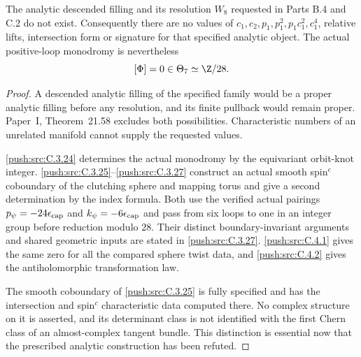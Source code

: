 \begin{corollary}\label{push:src:C.5.1}
The analytic descended filling and its resolution $W_8$
requested in Parts B.4 and C.2 do not exist. Consequently
there are no values of $c_1,c_2,p_1,p_1^2,p_1c_1^2,c_1^4$,
relative lifts, intersection form or signature for that
specified analytic object. The actual positive-loop
monodromy is nevertheless
\[
                    [\Phi]=0\in\Theta_7\simeq\Z/28.
\]
\end{corollary}

\begin{proof}
A descended analytic filling of the specified family
would be a proper analytic filling before any resolution,
and its finite pullback would remain proper. Paper~I, Theorem~21.58
excludes both possibilities. Characteristic numbers of
an unrelated manifold cannot supply the requested values.

\ref{push:src:C.3.24} determines the actual monodromy by the equivariant
orbit-knot integer. \ref{push:src:C.3.25}--\ref{push:src:C.3.27} construct an actual
smooth spin$^c$ coboundary of the clutching sphere and
mapping torus and give a second determination by the
index formula. Both use the verified actual pairings
$p_\psi=-24\epsilon_{\rm cap}$ and
$k_\psi=-6\epsilon_{\rm cap}$ and pass from six loops
to one in an integer group before reduction modulo $28$.
Their distinct boundary-invariant arguments and shared
geometric inputs are stated in \ref{push:src:C.3.27}. \ref{push:src:C.4.1} gives the
same zero for all the compared sphere twist data, and
\ref{push:src:C.4.2} gives the antiholomorphic transformation law.

The smooth coboundary of \ref{push:src:C.3.25} is fully specified and
has the intersection and spin$^c$ characteristic data
computed there. No complex structure on it is asserted,
and its determinant class is not identified with the first
Chern class of an almost-complex tangent bundle. This
distinction is essential now that the prescribed analytic
construction has been refuted.
\end{proof}


